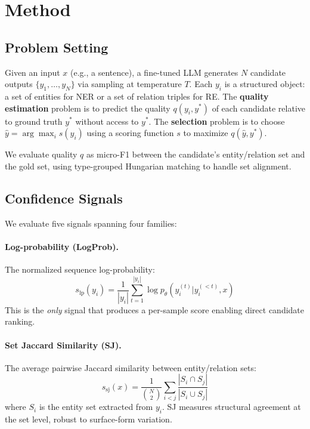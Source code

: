 \documentclass[11pt,a4paper]{article}
\begin{document}
\section{Method}
\label{sec:method}

\subsection{Problem Setting}
\label{sec:problem}

Given an input $x$ (e.g., a sentence), a fine-tuned LLM generates $N$ candidate outputs $\{y_1, \ldots, y_N\}$ via sampling at temperature $T$. Each $y_i$ is a structured object: a set of entities for NER or a set of relation triples for RE. The \textbf{quality estimation} problem is to predict the quality $q(y_i, y^*)$ of each candidate relative to ground truth $y^*$ without access to $y^*$. The \textbf{selection} problem is to choose $\hat{y} = \arg\max_i s(y_i)$ using a scoring function $s$ to maximize $q(\hat{y}, y^*)$.

We evaluate quality $q$ as micro-F1 between the candidate's entity/relation set and the gold set, using type-grouped Hungarian matching to handle set alignment.

\subsection{Confidence Signals}
\label{sec:signals}

We evaluate five signals spanning four families:

\paragraph{Log-probability (LogProb).}
The normalized sequence log-probability:
\begin{equation}
s_{\text{lp}}(y_i) = \frac{1}{|y_i|} \sum_{t=1}^{|y_i|} \log p_\theta(y_i^{(t)} | y_i^{(<t)}, x)
\end{equation}
This is the \emph{only} signal that produces a per-sample score enabling direct candidate ranking.

\paragraph{Set Jaccard Similarity (SJ).}
The average pairwise Jaccard similarity between entity/relation sets:
\begin{equation}
s_{\text{sj}}(x) = \frac{1}{\binom{N}{2}} \sum_{i < j} \frac{|S_i \cap S_j|}{|S_i \cup S_j|}
\end{equation}
where $S_i$ is the entity set extracted from $y_i$. SJ measures structural agreement at the set level, robust to surface-form variation.
\end{document}
